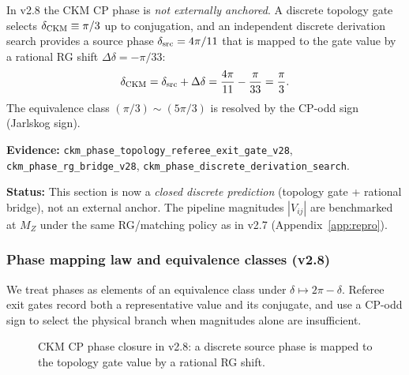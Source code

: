\begin{tcolorbox}[colback=green!3, colframe=green!50!black, breakable,
title={\textbf{CKM phase closure (v2.8): topology gate + RG bridge}}, fonttitle=\bfseries\small]
In v2.8 the CKM CP phase is \emph{not externally anchored}. A discrete topology gate selects
$\delta_{\rm CKM}\equiv \pi/3$ up to conjugation, and an independent discrete derivation
search provides a source phase $\delta_{\rm src}=4\pi/11$ that is mapped to the gate value
by a rational RG shift $\Delta\delta=-\pi/33$:
\[
\delta_{\rm CKM}=\delta_{\rm src}+\Delta\delta=\frac{4\pi}{11}-\frac{\pi}{33}=\frac{\pi}{3}.
\]
The equivalence class $(\pi/3)\sim(5\pi/3)$ is resolved by the CP-odd sign (Jarlskog sign).

\textbf{Evidence:} \texttt{ckm\_phase\_topology\_referee\_exit\_gate\_v28}, \texttt{ckm\_phase\_rg\_bridge\_v28}, \texttt{ckm\_phase\_discrete\_derivation\_search}.

\textbf{Status:} This section is now a \emph{closed discrete prediction} (topology gate + rational bridge), not an external anchor. The pipeline magnitudes $|V_{ij}|$ are benchmarked at $M_Z$ under the same RG/matching policy as in v2.7 (Appendix~\ref{app:repro}).
\end{tcolorbox}

\subsubsection{Phase mapping law and equivalence classes (v2.8)}
We treat phases as elements of an equivalence class under $\delta\mapsto 2\pi-\delta$.
Referee exit gates record both a representative value and its conjugate, and use a CP-odd
sign to select the physical branch when magnitudes alone are insufficient.

\begin{figure}[H]
\centering
{}
\caption{CKM CP phase closure in v2.8: a discrete source phase is mapped to the topology gate value by a rational RG shift.}
\label{fig:ckm-phase-bridge}
\end{figure}

